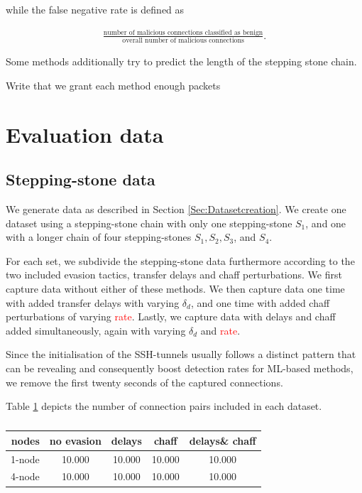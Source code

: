 \documentclass[conference]{IEEEtran}\usepackage[]{graphicx}\usepackage[]{color}
\begin{document}
while the false negative rate is defined as

\begin{align*}
\frac{\text{number of malicious connections classified as benign}}{\text{overall number of malicious connections}}.
\end{align*}

Some methods additionally try to predict the length of the stepping stone chain.

Write that we grant each method enough packets

\section{Evaluation data}


\subsection{Stepping-stone data}

We generate data as described in Section \ref{Sec:Datasetcreation}. We create one dataset using a stepping-stone chain with only one stepping-stone $S_1$, and one with a longer chain of four stepping-stones $S_1, S_2, S_3$, and $S_4$. 

For each set, we subdivide the stepping-stone data furthermore according to the two included evasion tactics, transfer delays and chaff perturbations. We first capture data without either of these methods. We then capture data one time with added transfer delays with varying $\delta_d$, and one time with added chaff perturbations of varying \textcolor{red}{rate}. Lastly, we capture data with delays and chaff added simultaneously, again with varying $\delta_d$ and \textcolor{red}{rate}.

Since the initialisation of the SSH-tunnels usually follows a distinct pattern that can be revealing and consequently boost detection rates for ML-based methods, we remove the first twenty seconds of the captured connections. 

Table \ref{Tab:Stepstone_data} depicts the number of connection pairs included in each dataset.

\begin{table}
\centering
\begin{tabular}{r|c|c|c|c}
nodes & no evasion & delays & chaff & delays\& chaff  \\
\hline
1-node & 10.000 & 10.000 & 10.000 & 10.000 \\
4-node & 10.000 & 10.000 & 10.000 & 10.000 \\
\end{tabular}
\caption{}\label{Tab:Stepstone_data}
\end{table}
\end{document}
